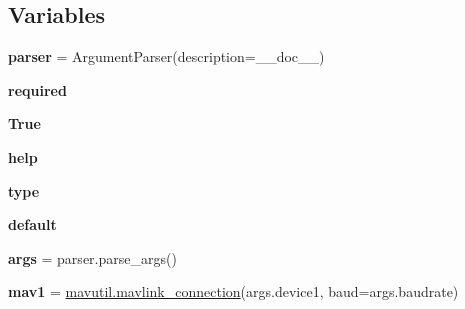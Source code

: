 \subsection*{Variables}
\begin{DoxyCompactItemize}
\item 
\mbox{\label{namespacepymavlink_1_1examples_1_1magtest_a783ce71ad67e0f1debb63c6d8779babb}} 
{\bfseries parser} = Argument\+Parser(description=\+\_\+\+\_\+doc\+\_\+\+\_\+)
\item 
\mbox{\label{namespacepymavlink_1_1examples_1_1magtest_a5b41d82a28a2e1c5c0fb911678cab960}} 
{\bfseries required}
\item 
\mbox{\label{namespacepymavlink_1_1examples_1_1magtest_a95dcb191104e324188f52da5a45cf367}} 
{\bfseries True}
\item 
\mbox{\label{namespacepymavlink_1_1examples_1_1magtest_a37c7962cfe6f9c457707998e282ebb37}} 
{\bfseries help}
\item 
\mbox{\label{namespacepymavlink_1_1examples_1_1magtest_a2233a45330480258997f60ba4baa5645}} 
{\bfseries type}
\item 
\mbox{\label{namespacepymavlink_1_1examples_1_1magtest_ae658889b371954a05783abfb1df07ebd}} 
{\bfseries default}
\item 
\mbox{\label{namespacepymavlink_1_1examples_1_1magtest_a3d082598042717821fce72281a19d9f0}} 
{\bfseries args} = parser.\+parse\+\_\+args()
\item 
\mbox{\label{namespacepymavlink_1_1examples_1_1magtest_af56e58adebd478f91d306c5a095c9e4d}} 
{\bfseries mav1} = \hyperlink{namespacepymavlink_1_1mavutil_a021b0a1b1d488c0800662acaef819852}{mavutil.\+mavlink\+\_\+connection}(args.\+device1, baud=args.\+baudrate)
\item 
\mbox{\label{namespacepymavlink_1_1examples_1_1magtest_a3516235c2a928876739d7982bd9f5577}} 

\end{DoxyCompactItemize}

